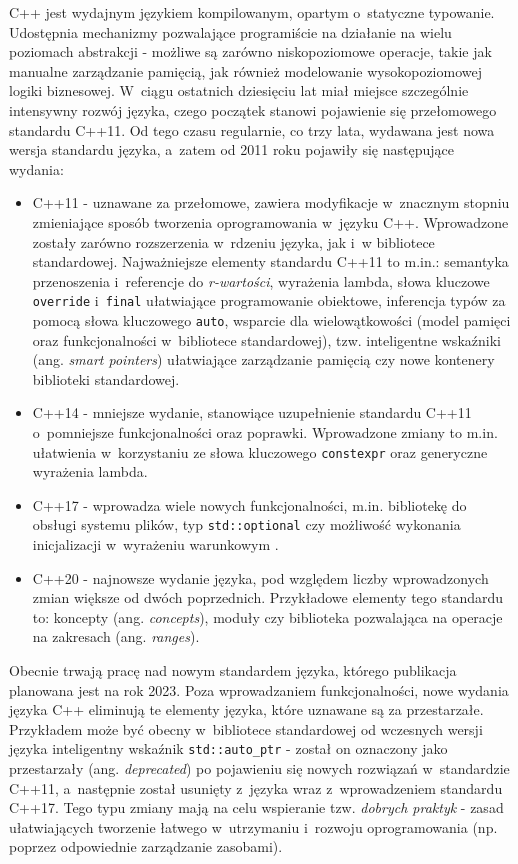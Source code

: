C++ jest wydajnym językiem kompilowanym, opartym o~statyczne typowanie. Udostępnia mechanizmy pozwalające programiście na działanie na wielu poziomach abstrakcji - możliwe są zarówno niskopoziomowe operacje, takie jak manualne zarządzanie pamięcią, jak również modelowanie wysokopoziomowej logiki biznesowej. W~ciągu ostatnich dziesięciu lat miał miejsce szczególnie intensywny rozwój języka, czego początek stanowi pojawienie się przełomowego standardu C++11. Od tego czasu regularnie, co trzy lata, wydawana jest nowa wersja standardu języka, a~zatem od 2011 roku pojawiły się następujące wydania:
\begin{itemize}
\item C++11 - uznawane za przełomowe, zawiera modyfikacje w~znacznym stopniu zmieniające sposób tworzenia oprogramowania w~języku C++. Wprowadzone zostały zarówno rozszerzenia w~rdzeniu języka, jak i~w bibliotece standardowej. Najważniejsze elementy standardu C++11 to m.in.: semantyka przenoszenia i~referencje do \emph{r-wartości}, wyrażenia lambda, słowa kluczowe \lstinline{override} i~\lstinline{final} ułatwiające programowanie obiektowe, inferencja typów za pomocą słowa kluczowego \lstinline{auto}, wsparcie dla wielowątkowości (model pamięci oraz funkcjonalności w~bibliotece standardowej), tzw. inteligentne wskaźniki (ang. \emph{smart pointers}) ułatwiające zarządzanie pamięcią czy nowe kontenery biblioteki standardowej.
\item C++14 - mniejsze wydanie, stanowiące uzupełnienie standardu C++11 o~pomniejsze funkcjonalności oraz poprawki. Wprowadzone zmiany to m.in. ułatwienia w~korzystaniu ze słowa kluczowego \lstinline{constexpr} oraz generyczne wyrażenia lambda. 
\item C++17 - wprowadza wiele nowych funkcjonalności, m.in. bibliotekę do obsługi systemu plików, typ \lstinline{std::optional} czy możliwość wykonania inicjalizacji w~wyrażeniu warunkowym \cite{cpp17_book}.
\item C++20 - najnowsze wydanie języka, pod względem liczby wprowadzonych zmian większe od dwóch poprzednich. Przykładowe elementy tego standardu to: koncepty (ang. \emph{concepts}), moduły czy biblioteka pozwalająca na operacje na zakresach (ang. \emph{ranges}).
\end{itemize}

Obecnie trwają pracę nad nowym standardem języka, którego publikacja planowana jest na rok 2023. Poza wprowadzaniem funkcjonalności, nowe wydania języka C++ eliminują te elementy języka, które uznawane są za przestarzałe. Przykładem może być obecny w~bibliotece standardowej od wczesnych wersji języka inteligentny wskaźnik \lstinline{std::auto_ptr} - został on oznaczony jako przestarzały (ang. \emph{deprecated}) po pojawieniu się nowych rozwiązań w~standardzie C++11, a~następnie został usunięty z~języka wraz z~wprowadzeniem standardu C++17. Tego typu zmiany mają na celu wspieranie tzw. \emph{dobrych praktyk} - zasad ułatwiających tworzenie łatwego w~utrzymaniu i~rozwoju oprogramowania (np. poprzez odpowiednie zarządzanie zasobami).

